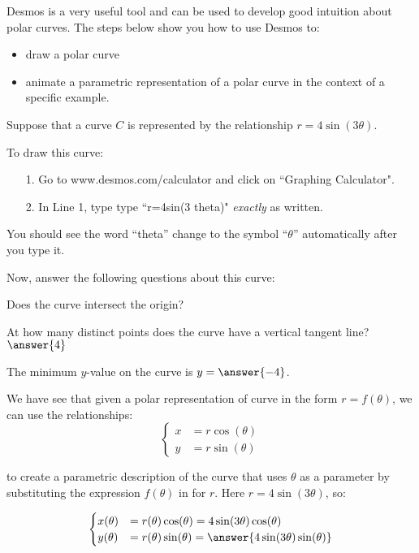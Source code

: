 \documentclass{ximera}
\author{Jim Talamo}
\begin{document}
\begin{exercise}
Desmos is a very useful tool and can be used to develop good intuition about polar curves.  The steps below show you how to use Desmos to:

\begin{itemize}
\item draw a polar curve
\item  animate a parametric representation of a polar curve in the context of a specific example.
\end{itemize}

Suppose that a curve $C$ is represented by the relationship $r=4 \sin(3\theta)$.

To draw this curve:

\begin{itemize}
\item[1.] Go to www.desmos.com/calculator and click on ``Graphing Calculator".
\item[2.] In Line 1, type  type ``r=4sin(3 theta)" \emph{exactly} as written.
\end{itemize}


You should see the word ``theta'' change to the symbol ``$\theta$'' automatically after you type it.

Now, answer the following questions about this curve:

Does the curve intersect the origin?

\begin{multipleChoice}
\end{multipleChoice}


At how many distinct points does the curve have a vertical tangent line?  $\answer{4}$

The minimum $y$-value on the curve is $y=\answer{-4}$.

\begin{exercise}
We have see that given a polar representation of curve in the form $r=f(\theta)$, we can use the relationships:
\[\begin{cases}
x&=r \cos(\theta) \\
y&=r \sin(\theta)
\end{cases}\]

to create a parametric description of the curve that uses $\theta$ as a parameter by substituting the expression $f(\theta)$ in for $r$.  Here $r= 4 \sin(3\theta)$, so:

\[\begin{cases}
x(\theta) &=r(\theta) \cos(\theta) = 4 \sin(3\theta) \cos(\theta) \\
y(\theta) &=r(\theta) \sin(\theta) = \answer{4 \sin(3\theta) \sin(\theta)}
\end{cases}\]


\end{exercise}
\end{exercise}
\end{document}
